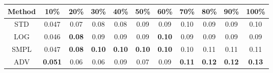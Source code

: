 \documentclass{standalone}
\begin{document}
\begin{tabular}{c|cccccccccc}
      \toprule
      Method & 10\% & 20\% & 30\% & 40\% & 50\% & 60\% & 70\% & 80\% & 90\% & 100\% \\
      \midrule
STD & 0.047 & 0.07 & 0.08 & 0.08 & 0.09 & 0.09 & 0.10 & 0.09 & 0.09 & 0.10\\
LOG & 0.046 & \textbf{0.08} & 0.09 & 0.09 & 0.09 & \textbf{0.10} & 0.09 & 0.09 & 0.09 & 0.09\\
SMPL & 0.047 & \textbf{0.08} & \textbf{0.10} & \textbf{0.10} & \textbf{0.10} & \textbf{0.10} & 0.10 & 0.11 & 0.11 & 0.11\\
ADV & \textbf{0.051} & 0.06 & 0.06 & 0.09 & 0.07 & 0.09 & \textbf{0.11} & \textbf{0.12} & \textbf{0.12} & \textbf{0.13}\\
  \bottomrule
\end{tabular}
\end{document}
